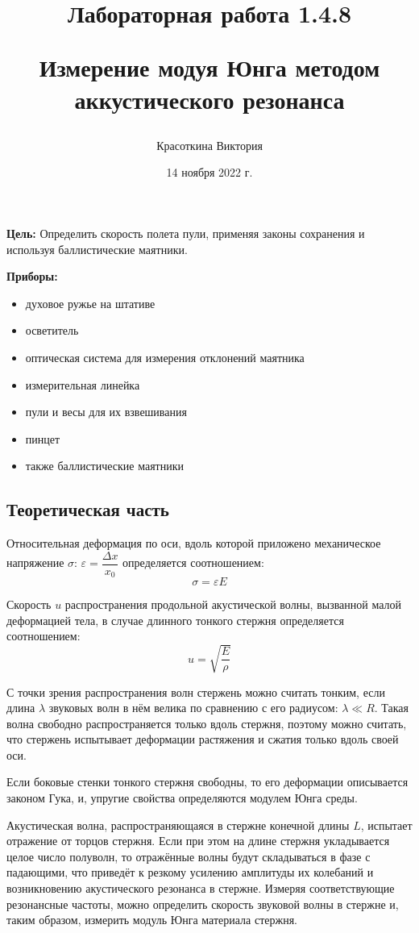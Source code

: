 \documentclass[a4paper,12pt]{article}
\author{Красоткина Виктория}
\title{Лабораторная работа 1.4.8

Измерение модуя Юнга методом аккустического резонанса}
\date{14 ноября 2022 г.}
\begin{document}
\maketitle
\thispagestyle{empty}

\newpage
\setcounter{page}{1}

\textbf{Цель:}
Определить скорость полета пули, применяя законы сохранения и используя баллистические маятники.

\textbf{Приборы:}
\begin{itemize}
    \item духовое ружье на штативе
    \item осветитель
    \item оптическая система для измерения отклонений маятника
    \item измерительная линейка
    \item пули и весы для их взвешивания
    \item пинцет
    \item также баллистические маятники
\end{itemize}

\subsection*{Теоретическая часть}   
	Относительная деформация по оси, вдоль которой приложено механическое напряжение $\sigma$:  $\varepsilon = \dfrac{\Delta x}{x_0}$ определяется соотношением:
	$$
	\sigma=\varepsilon E
	$$

	Скорость $u$ распространения продольной акустической волны, вызванной малой деформацией тела, в случае длинного тонкого стержня определяется соотношением:
	$$
	u=\sqrt{\frac{E}{\rho}}
	$$

	С точки зрения распространения волн стержень
	можно считать тонким, если длина $\lambda$ звуковых волн в нём велика по сравнению с его радиусом: $\lambda \ll R$. Такая волна свободно распространяется только вдоль стержня, поэтому можно считать, что стержень испытывает деформации растяжения и сжатия только вдоль своей оси.

	Если боковые стенки тонкого
	стержня свободны, то его деформации описывается законом Гука, и, упругие свойства
	определяются модулем Юнга среды.
	
	Акустическая волна, распространяющаяся в стержне конечной длины $L$,
	испытает отражение от торцов стержня. Если при этом на длине стержня
	укладывается целое число полуволн, то отражённые волны будут складываться в фазе с падающими, что приведёт к резкому усилению амплитуды
	их колебаний и возникновению акустического резонанса в стержне. Измеряя соответствующие резонансные частоты, можно определить скорость
	звуковой волны в стержне и, таким образом, измерить модуль Юнга материала стержня.
	
\end{document}
